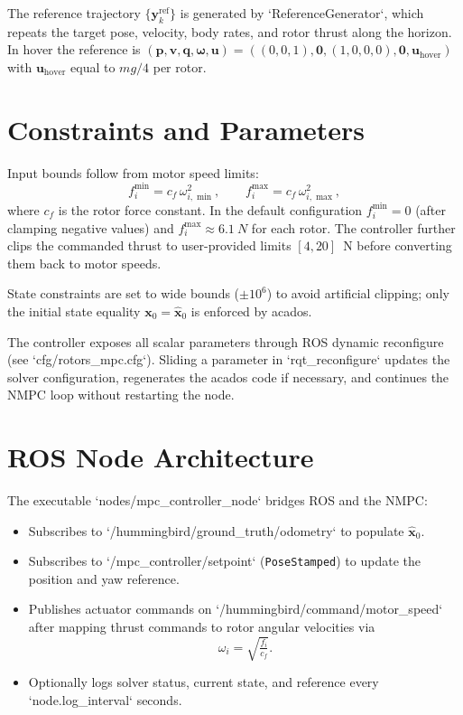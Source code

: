 \documentclass[11pt,a4paper]{article}
\begin{document}
The reference trajectory $\{\bm{y}_k^{\text{ref}}\}$ is generated by `ReferenceGenerator`, which repeats the target pose, velocity, body rates, and rotor thrust along the horizon. In hover the reference is $(\bm{p}, \bm{v}, \bm{q}, \bm{\omega}, \bm{u}) = ((0,0,1), \bm{0}, (1,0,0,0), \bm{0}, \bm{u}_\text{hover})$ with $\bm{u}_\text{hover}$ equal to $mg/4$ per rotor.

\section{Constraints and Parameters}

Input bounds follow from motor speed limits:
\begin{equation}
    f_i^{\min} = c_f \, \omega_{i,\min}^2, \qquad
    f_i^{\max} = c_f \, \omega_{i,\max}^2,
\end{equation}
where $c_f$ is the rotor force constant. In the default configuration $f_i^{\min} = 0$ (after clamping negative values) and $f_i^{\max} \approx \SI{6.1}{N}$ for each rotor. The controller further clips the commanded thrust to user-provided limits $[4,20]$~N before converting them back to motor speeds.

State constraints are set to wide bounds ($\pm 10^6$) to avoid artificial clipping; only the initial state equality $\bm{x}_0 = \hat{\bm{x}}_0$ is enforced by acados.

The controller exposes all scalar parameters through ROS dynamic reconfigure (see `cfg/rotors_mpc.cfg`). Sliding a parameter in `rqt\_reconfigure` updates the solver configuration, regenerates the acados code if necessary, and continues the NMPC loop without restarting the node.

\section{ROS Node Architecture}

The executable `nodes/mpc_controller_node` bridges ROS and the NMPC:
\begin{itemize}
    \item Subscribes to `/hummingbird/ground_truth/odometry` to populate $\hat{\bm{x}}_0$.
    \item Subscribes to `/mpc_controller/setpoint` (\texttt{PoseStamped}) to update the position and yaw reference.
    \item Publishes actuator commands on `/hummingbird/command/motor_speed` after mapping thrust commands to rotor angular velocities via
    \begin{equation}
        \omega_i = \sqrt{ \tfrac{f_i}{c_f} }.
    \end{equation}
    \item Optionally logs solver status, current state, and reference every `node.log_interval` seconds.
\end{itemize}
\end{document}
